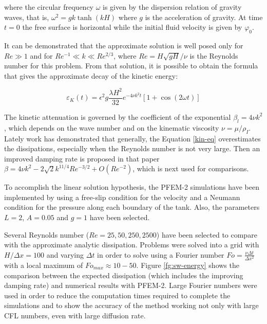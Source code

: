 \documentclass[a4paper,conference]{IEEEtran}
\begin{document}
where the circular frequency $\omega$ is given by the dispersion relation of gravity waves, that is, $\omega^2 = g k \tanh(kH)$ where $g$ is the acceleration of gravity. At time $t = 0$ the free surface is horizontal while the initial fluid velocity is given by $\varphi_0$.

It can be demonstrated that the approximate solution is well posed only for $Re\gg1$ and for $Re^{-1}\ll k \ll Re^{2/3}$, where $Re=H\sqrt{gH}/\nu$ is the Reynolds number for this problem. From that solution, it is possible to obtain the formula that gives the approximate decay of the kinetic energy\cite{Lighthill01}:

\begin{equation}
 \varepsilon_K(t) = \epsilon^2g\frac{\lambda H^2}{32}e^{-4\nu k^2t}\left[1+\cos(2\omega t)\right]
 \label{kin-eq}
\end{equation}

The kinetic attenuation is governed by the coefficient of the exponential $\beta_l = 4\nu k^2$, which depends on the wave number and on the kinematic viscosity $\nu = \mu/\rho_{I}$. Lately work\cite{Antuono13} has demonstrated that generally, the Equation \ref{kin-eq} overestimates the dissipations, especially when the Reynolds number is not very large. Then an improved damping rate is proposed in that paper $\beta = 4\nu k^2 -  2\sqrt{2}k^{11/4}Re^{-3/2}+O(Re^{-2})$, which is next used for comparisons.

To accomplish the linear solution hypothesis, the PFEM-2 simulations have been implemented by using a free-slip condition for the velocity and a Neumann condition for the pressure along each boundary of the tank. Also, the parameters $L=2$, $A=0.05$ and $g=1$ have been selected.

Several Reynolds number ($Re=25,50,250,2500$) have been selected to compare with the approximate analytic dissipation. Problems were solved into a grid with $H/\Delta x=100$ and varying $\Delta t$ in order to solve using a Fourier number $Fo=\frac{\nu\Delta t}{\Delta x^2}$ with a local maximum of $Fo_{max}\approx10-50$. Figure \ref{fg:sw-energy} shows the comparison between the expected dissipation (which includes the improving damping rate) and numerical results with PFEM-2. Large Fourier numbers were used in order to reduce the computation times required to complete the simulations and to show the accuracy of the method working not only with large CFL numbers, even with large diffusion rate.
\end{document}
